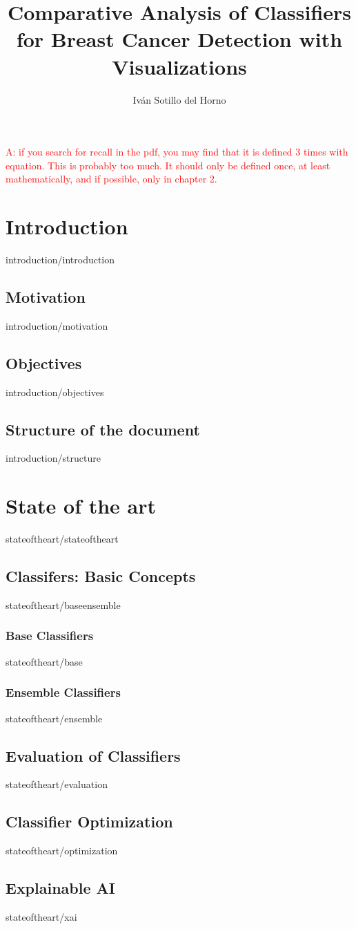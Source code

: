 \documentclass[covers, firstnumbered, tfg, extendedindex, epsbased, english, final]{tfgtfmthesisuam}
\title{Comparative Analysis of Classifiers for Breast Cancer Detection with Visualizations}
\author{Iván Sotillo del Horno}
\newcommand{\ab}[1]{\textcolor{red}{A: #1}}
\begin{document}
\ab{if you search for recall in the pdf, you may find that it is defined 3 times with equation. This is probably too much. It should only be defined once, at least mathematically, and if possible, only in chapter 2.}

\chapter{Introduction\label{CAP:INTRODUCTION}}{introduction/introduction}
\section{Motivation}{introduction/motivation}
\section{Objectives}{introduction/objectives}
\section{Structure of the document}{introduction/structure}

\chapter{State of the art}{stateoftheart/stateoftheart}
\section{Classifers: Basic Concepts\label{SEC:BASEENSEMBLE}}{stateoftheart/baseensemble}
\subsection{Base Classifiers}{stateoftheart/base}
\subsection{Ensemble Classifiers}{stateoftheart/ensemble}
\section{Evaluation of Classifiers\label{SEC:EVALUATION}}{stateoftheart/evaluation}
\section{Classifier Optimization\label{SEC:OPTIMIZATION}}{stateoftheart/optimization}

\section{Explainable AI}{stateoftheart/xai}
\end{document}
